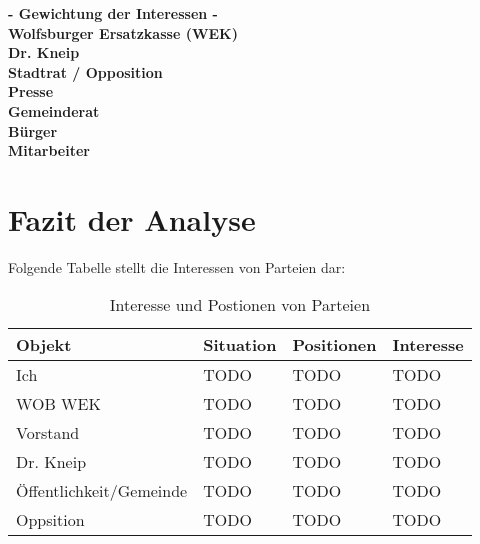 \smallskip \textbf{- Gewichtung der Interessen -} \\
\smallskip \textbf{Wolfsburger Ersatzkasse (WEK)} \\
\smallskip \textbf{Dr. Kneip} \\
\smallskip \textbf{Stadtrat / Opposition} \\
\smallskip \textbf{Presse} \\
\smallskip \textbf{Gemeinderat} \\
\smallskip \textbf{Bürger} \\
\smallskip \textbf{Mitarbeiter} \\

\section{Fazit der Analyse}
Folgende Tabelle stellt die Interessen von Parteien dar:
\begin{table}[h]
\begin{center}
\begin{tabular}{|l|l|l|l|}\hline
\textbf{Objekt} & \textbf{Situation} & \textbf{Positionen} & \textbf{Interesse} \\
\hline\hline
Ich & TODO & TODO & TODO  \\
\hline
WOB WEK & TODO & TODO & TODO \\
\hline
Vorstand & TODO & TODO & TODO \\
\hline
Dr. Kneip & TODO & TODO & TODO \\
\hline
Öffentlichkeit/Gemeinde & TODO & TODO & TODO \\
\hline
Oppsition & TODO & TODO & TODO \\
\hline
\end{tabular}
\caption{Interesse und Postionen von Parteien}
\label{tab:interesseUndPositionen}
\end{center}
\end{table}